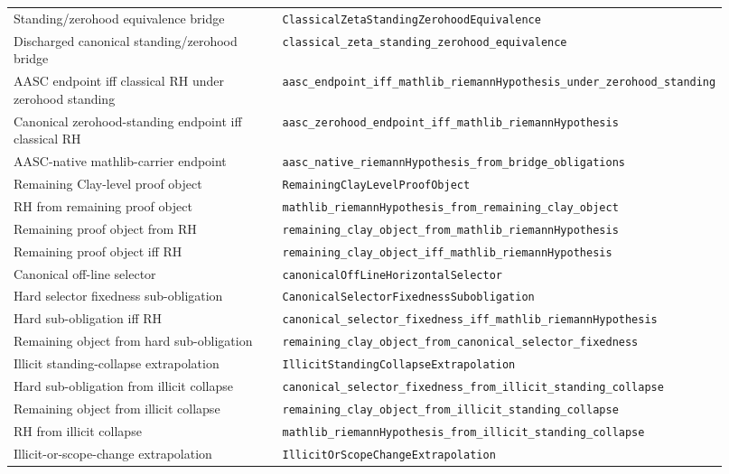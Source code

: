 \documentclass[11pt]{article}
\begin{document}
\begin{center}
\begin{longtable}{p{0.44\linewidth}p{0.48\linewidth}}
Standing/zerohood equivalence bridge
  & \texttt{ClassicalZetaStandingZerohoodEquivalence} \\
Discharged canonical standing/zerohood bridge
  & \texttt{classical\_zeta\_standing\_zerohood\_equivalence} \\
AASC endpoint iff classical RH under zerohood standing
  & \texttt{aasc\_endpoint\_iff\_mathlib\_riemannHypothesis\_under\_zerohood\_standing} \\
Canonical zerohood-standing endpoint iff classical RH
  & \texttt{aasc\_zerohood\_endpoint\_iff\_mathlib\_riemannHypothesis} \\
AASC-native mathlib-carrier endpoint
  & \texttt{aasc\_native\_riemannHypothesis\_from\_bridge\_obligations} \\
Remaining Clay-level proof object
  & \texttt{RemainingClayLevelProofObject} \\
RH from remaining proof object
  & \texttt{mathlib\_riemannHypothesis\_from\_remaining\_clay\_object} \\
Remaining proof object from RH
  & \texttt{remaining\_clay\_object\_from\_mathlib\_riemannHypothesis} \\
Remaining proof object iff RH
  & \texttt{remaining\_clay\_object\_iff\_mathlib\_riemannHypothesis} \\
Canonical off-line selector
  & \texttt{canonicalOffLineHorizontalSelector} \\
Hard selector fixedness sub-obligation
  & \texttt{CanonicalSelectorFixednessSubobligation} \\
Hard sub-obligation iff RH
  & \texttt{canonical\_selector\_fixedness\_iff\_mathlib\_riemannHypothesis} \\
Remaining object from hard sub-obligation
  & \texttt{remaining\_clay\_object\_from\_canonical\_selector\_fixedness} \\
Illicit standing-collapse extrapolation
  & \texttt{IllicitStandingCollapseExtrapolation} \\
Hard sub-obligation from illicit collapse
  & \texttt{canonical\_selector\_fixedness\_from\_illicit\_standing\_collapse} \\
Remaining object from illicit collapse
  & \texttt{remaining\_clay\_object\_from\_illicit\_standing\_collapse} \\
RH from illicit collapse
  & \texttt{mathlib\_riemannHypothesis\_from\_illicit\_standing\_collapse} \\
Illicit-or-scope-change extrapolation
  & \texttt{IllicitOrScopeChangeExtrapolation} \\

\end{longtable}
\end{center}
\end{document}
